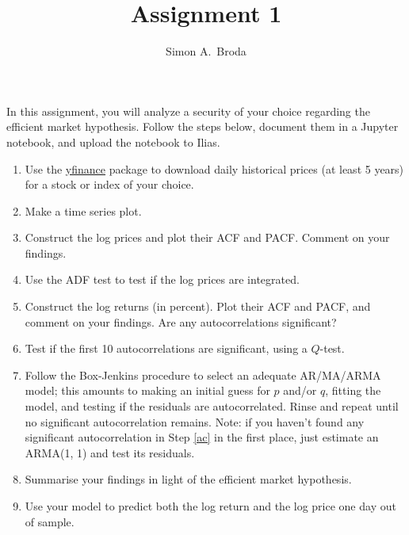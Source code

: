 \documentclass[11pt, a4paper]{article}
\begin{document}
\title{Assignment 1}
\author{Simon A.\ Broda}
\date{}
\maketitle
In this assignment, you will analyze a security of your choice regarding the efficient market hypothesis. Follow the steps below, document them in a Jupyter notebook, and upload the notebook to Ilias.
\begin{enumerate}
	\item Use the \href{https://aroussi.com/post/python-yahoo-finance}{yfinance} package to download daily historical prices (at least 5 years) for a stock or index of your choice.
	\item Make a time series plot.
    \item Construct the log prices and plot their ACF and PACF. Comment on your findings.
    \item Use the ADF test to test if the log prices are integrated.
    \item Construct the log returns (in percent). Plot their ACF and PACF, and comment on your findings. Are any autocorrelations significant?\label{ac}
    \item Test if the first 10 autocorrelations are significant, using a $Q$-test.
    \item Follow the Box-Jenkins procedure to select an adequate AR/MA/ARMA model; this amounts to making an initial guess for $p$ and/or $q$, fitting the model, and testing if the residuals are autocorrelated. Rinse and repeat until no significant autocorrelation remains. Note: if you haven't found any significant autocorrelation in Step \ref{ac} in the first place, just estimate an ARMA(1, 1) and test its residuals.
    \item Summarise your findings in light of the efficient market hypothesis.
    \item Use your model to predict both the log return and the log price one day out of sample.

\end{enumerate}
\end{document}

